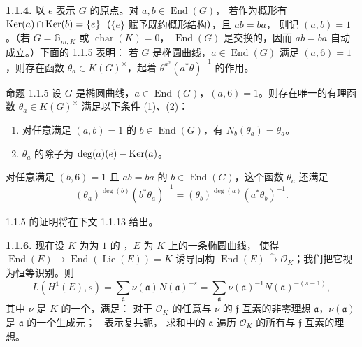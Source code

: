 \noindent\textbf{1.1.4.} 以 $e$ 表示 $G$ 的原点。对 $a,b\in\operatorname{End}(G)$，
若作为概形有 $\operatorname{Ker}(a)\cap\operatorname{Ker}(b)=\{e\}$（$\{e\}$ 赋予既约概形结构），且 $ab=ba$，
则记 $(a,b)=1$。（若 $G=\mathbb G_{m,K}$ 或 $\operatorname{char}(K)=0$，
$\operatorname{End}(G)$ 是交换的，因而 $ab=ba$ 自动成立。）下面的 1.1.5 表明：
若 $G$ 是椭圆曲线，$a\in\operatorname{End}(G)$ 满足 $(a,6)=1$，则存在函数
$\theta_a\in K(G)^\times$，起着 $\theta^{a^2}(a^*\theta)^{-1}$ 的作用。
\begin{statement}{命题 1.1.5}
设 $G$ 是椭圆曲线，$a\in\operatorname{End}(G)$，$(a,6)=1$。则存在唯一的有理函数
$\theta_a\in K(G)^\times$ 满足以下条件 (1)、(2)：
\begin{enumerate}[label=(\arabic*)]
\item 对任意满足 $(a,b)=1$ 的 $b\in\operatorname{End}(G)$，有 $N_b(\theta_a)=\theta_a$。
\item $\theta_a$ 的除子为 $\deg(a)(e)-\operatorname{Ker}(a)$。
\end{enumerate}
对任意满足 $(b,6)=1$ 且 $ab=ba$ 的 $b\in\operatorname{End}(G)$，这个函数 $\theta_a$ 还满足
\begin{equation*}\tag{3}
(\theta_a)^{\deg(b)}(b^*\theta_a)^{-1}
=(\theta_b)^{\deg(a)}(a^*\theta_b)^{-1}.
\end{equation*}
\end{statement}
1.1.5 的证明将在下文 1.1.13 给出。

\noindent\textbf{1.1.6.} 现在设 $K$ 为为 $1$ 的
，$E$ 为 $K$ 上的一条椭圆曲线，
使得 $\operatorname{End}(E)\to\operatorname{End}(\operatorname{Lie}(E))=K$ 诱导同构
$\operatorname{End}(E)\xrightarrow{\sim}\mathcal O_K$；我们把它视为恒等识别。则
\[
L(H^1(E),s)=\sum_{\mathfrak a}\overline{\nu(\mathfrak a)}N(\mathfrak a)^{-s}
=\sum_{\mathfrak a}\nu(\mathfrak a)^{-1}N(\mathfrak a)^{-(s-1)},
\]
其中 $\nu$ 是 $K$ 的一个，满足：
对于 $\mathcal O_K$ 的任意与 $\nu$ 的 $\mathfrak f$ 互素的非零理想
$\mathfrak a$，$\nu(\mathfrak a)$ 是 $\mathfrak a$ 的一个生成元；$\overline{\phantom x}$ 表示复共轭，
求和中的 $\mathfrak a$ 遍历 $\mathcal O_K$ 的所有与 $\mathfrak f$ 互素的理想。


